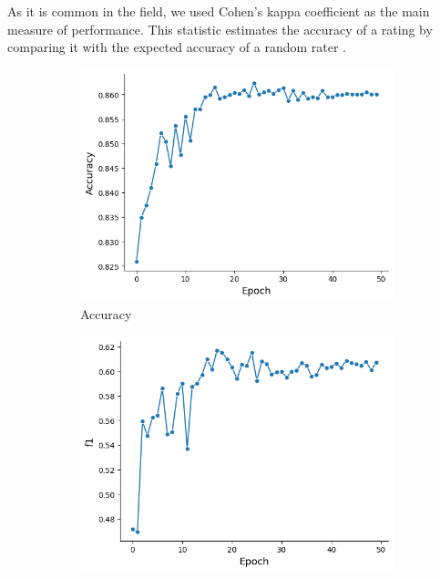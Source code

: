 As it is common in the field, we used Cohen's kappa coefficient as the main measure of performance. This statistic estimates the accuracy of a rating by comparing it with the expected accuracy of a random rater \cite{cohen1960kappa}. 

\begin{figure}[tb]
     \centering
     \begin{subfigure}[b]{0.32\textwidth}
         \centering
         \includegraphics[width=\textwidth]{figures/chapter5/metrics/accuracy.png}
         \caption{Accuracy}
         \label{fig:accuracy}
     \end{subfigure}
     \hfill
     \begin{subfigure}[b]{0.32\textwidth}
         \centering
         \includegraphics[width=\textwidth]{figures/chapter5/metrics/f1.png}

\end{subfigure}
\end{figure}
